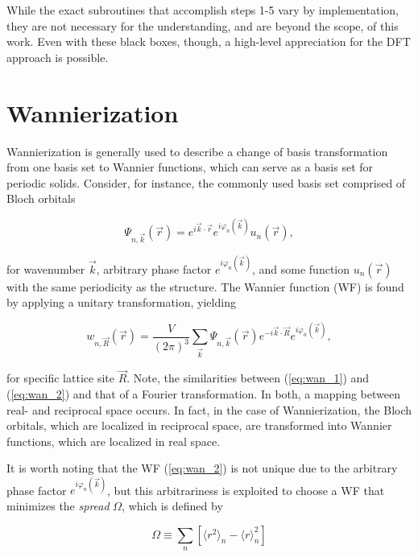     While the exact subroutines that accomplish steps 1-5 vary by implementation, they are not necessary for the understanding, and are beyond the scope, of this work. Even with these black boxes, though, a high-level appreciation for the DFT approach is possible.

\section{Wannierization}

Wannierization is generally used to describe a change of basis transformation from one basis set to Wannier functions, which can serve as a basis set for periodic solids. Consider, for instance, the commonly used basis set comprised of Bloch orbitals

\begin{equation}
\label{eq:wan_1}
    \Psi_{n,\vec{k}}(\Vec{r}) = e^{i\Vec{k}\cdot\Vec{r}} e^{i\varphi_n(\vec{k})} u_n(\vec{r}), 
\end{equation}

\noindent for wavenumber $\vec{k}$, arbitrary phase factor $e^{i\varphi_n(\vec{k})}$, and some function $u_n(\vec{r})$ with the same periodicity as the structure. The Wannier function (WF) is found by applying a unitary transformation, yielding

\begin{equation}
\label{eq:wan_2}
    w_{n,\vec{R}}(\Vec{r}) = \frac{V}{(2\pi)^3} \sum\limits_{\Vec{k}}  \Psi_{n,\vec{k}}(\Vec{r}) e^{-i\Vec{k}\cdot\Vec{R}} e^{i\varphi_n(\vec{k})},
\end{equation}

\noindent for specific lattice site $\vec{R}$. Note, the similarities between (\ref{eq:wan_1}) and (\ref{eq:wan_2}) and that of a Fourier transformation. In both, a mapping between real- and reciprocal space occurs. In fact, in the case of Wannierization, the Bloch orbitals, which are localized in reciprocal space, are transformed into Wannier functions, which are localized in real space.

It is worth noting that the WF (\ref{eq:wan_2}) is not unique due to the arbitrary phase factor $e^{i\varphi_n(\vec{k})}$, but this arbitrariness is exploited to choose a WF that minimizes the \textit{spread} $\Omega$, which is defined by

\begin{equation}
    \Omega \equiv \sum\limits_n \left[ \langle r^2 \rangle_n - \langle r \rangle^2_n \right]
\end{equation}


